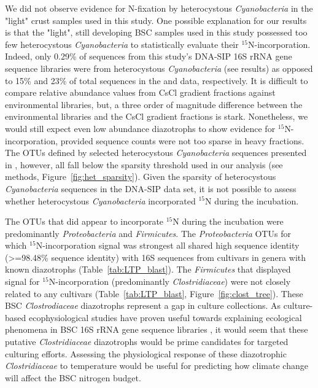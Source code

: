 We did not observe evidence for N-fixation by heterocystous
\textit{Cyanobacteria} in the "light" crust samples used in this study. One
possible explanation for our results is that the "light", still developing
BSC samples used in this study possessed too few heterocystous
\textit{Cyanobacteria} to statistically evaluate their $^{15}$N-incorporation.
Indeed, only 0.29\% of sequences from this study's DNA-SIP 16S rRNA gene
sequence libraries were from heterocystous \textit{Cyanobacteria} (see results)
as opposed to 15\% and 23\% of total sequences in the \citet{Steven_2013} and
\citet{Garcia_Pichel_2013} data, respectively. It is difficult to compare
relative abundance values from CsCl gradient fractions against environmental
libraries, but, a three order of magnitude difference between the
environmental libraries and the CsCl gradient fractions is stark.
Nonetheless, we would still expect even low abundance diazotrophs to show
evidence for $^{15}$N-incorporation, provided sequence counts were not too
sparse in heavy fractions. The OTUs defined by selected heterocystous
\textit{Cyanobacteria} sequences presented in \citet{Yeager}, however, all
fall below the sparsity threshold used in our analysis (see methods,
Figure~\ref{fig:het_sparsity}). Given the sparsity of heterocystous
\textit{Cyanobacteria} sequences in the DNA-SIP data set, it is not possible
to assess whether heterocystous \textit{Cyanobacteria} incorporated $^{15}$N
during the incubation.

The OTUs that did appear to incorporate $^{15}$N during the incubation were
predominantly \textit{Proteobacteria} and \textit{Firmicutes}. The
\textit{Proteobacteria} OTUs for which $^{15}$N-incorporation signal was
strongest all shared high sequence identity (\textgreater=98.48\% sequence
identity) with 16S sequences from cultivars in genera with known diazotrophs
(Table~\ref{tab:LTP_blast}). The \textit{Firmicutes} that displayed signal
for $^{15}$N-incorporation (predominantly \textit{Clostridiaceae}) were not
closely related to any cultivars (Table~\ref{tab:LTP_blast},
Figure~\ref{fig:clost_tree}). These BSC \textit{Clostrodiaceae} diazotrophs
represent a gap in culture collections. As culture-based ecophysiological
studies have proven useful towards explaining ecological phenomena in BSC 16S
rRNA gene sequence libraries \citep{Garcia_Pichel_2013}, it would seem that
these putative \textit{Clostridiaceae} diazotrophs would be prime candidates
for targeted culturing efforts. Assessing the physiological response of these
diazotrophic \textit{Clostridiaceae} to temperature would be useful for
predicting how climate change will affect the BSC nitrogen budget. 

